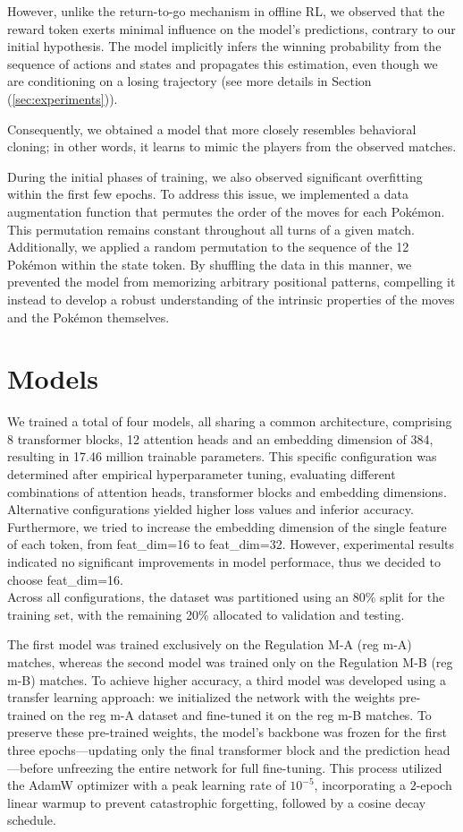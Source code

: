 \documentclass{article}
\begin{document}
However, unlike the return-to-go mechanism in offline RL, we observed that the reward token exerts minimal influence on the model's predictions, contrary to our initial hypothesis. The model implicitly infers the winning probability from the sequence of actions and states and propagates this estimation, even though we are conditioning on a losing trajectory (see more details in Section (\ref{sec:experiments})). 

Consequently, we obtained a model that more closely resembles behavioral cloning; in other words, it learns to mimic the players from the observed matches. 

During the initial phases of training, we also observed significant overfitting within the first few epochs. To address this issue, we implemented a data augmentation function that permutes the order of the moves for each Pokémon. This permutation remains constant throughout all turns of a given match. Additionally, we applied a random permutation to the sequence of the 12 Pokémon within the state token. By shuffling the data in this manner, we prevented the model from memorizing arbitrary positional patterns, compelling it instead to develop a robust understanding of the intrinsic properties of the moves and the Pokémon themselves.
\section{Models}
We trained a total of four models, all sharing a common architecture, comprising 8 transformer blocks, 12 attention heads and an embedding dimension of 384, resulting in 17.46 million trainable parameters. This specific configuration was determined after empirical hyperparameter tuning, evaluating different combinations of attention heads, transformer blocks and embedding dimensions. Alternative configurations yielded higher loss values and inferior accuracy. Furthermore, we tried to increase the embedding dimension of the single feature of each token, from feat\_dim=16 to feat\_dim=32. However, experimental results indicated no significant improvements in model performace, thus we decided to choose feat\_dim=16. \\

Across all configurations, the dataset was partitioned using an 80\% split for the training set, with the remaining 20\% allocated to validation and testing.


The first model was trained exclusively on the Regulation M-A (reg m-A) matches, whereas the second model was trained only on the Regulation M-B (reg m-B) matches. To achieve higher accuracy, a third model was developed using a transfer learning approach: we initialized the network with the weights pre-trained on the reg m-A dataset and fine-tuned it on the reg m-B matches. To preserve these pre-trained weights, the model's backbone was frozen for the first three epochs—updating only the final transformer block and the prediction head—before unfreezing the entire network for full fine-tuning. This process utilized the AdamW optimizer with a peak learning rate of $10^{-5}$, incorporating a $2$-epoch linear warmup to prevent catastrophic forgetting, followed by a cosine decay schedule.
\end{document}
